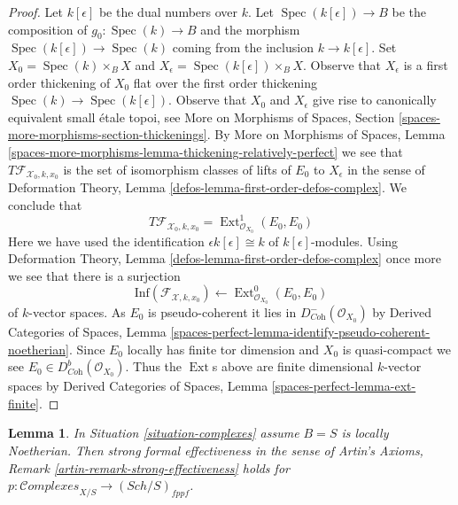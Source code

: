 \documentclass[10pt,a4paper]{amsart}
\theoremstyle{plain}
\newtheorem{lemma}[subsection]{Lemma}
\theoremstyle{definition}
\theoremstyle{remark}
\numberwithin{equation}{subsection}
\def\Spec{\mathop{\mathrm{Spec}}}
\def\Ext{\mathop{\mathrm{Ext}}\nolimits}
\def\Sch{\mathit{Sch}}
\def\Complexesstack{\mathcal{C}\!\mathit{omplexes}}
\begin{document}
\begin{proof}
\medskip\noindent
Let $k[\epsilon]$ be the dual numbers over $k$.
Let $\Spec(k[\epsilon]) \to B$ be the composition of $g_0 : \Spec(k) \to B$
and the morphism $\Spec(k[\epsilon]) \to \Spec(k)$
coming from the inclusion $k \to k[\epsilon]$.
Set $X_0 = \Spec(k) \times_B X$ and
$X_\epsilon = \Spec(k[\epsilon]) \times_B X$.
Observe that $X_\epsilon$ is a first order thickening of $X_0$
flat over the first order thickening $\Spec(k) \to \Spec(k[\epsilon])$.
Observe that $X_0$ and $X_\epsilon$ give rise to canonically equivalent
small \'etale topoi, see
More on Morphisms of Spaces, Section
\ref{spaces-more-morphisms-section-thickenings}.
By More on Morphisms of Spaces, Lemma
\ref{spaces-more-morphisms-lemma-thickening-relatively-perfect}
we see that $T\mathcal{F}_{\mathcal{X}_0, k, x_0}$ is the set of
isomorphism classes of lifts of $E_0$ to $X_\epsilon$ in the sense of
Deformation Theory, Lemma \ref{defos-lemma-first-order-defos-complex}.
We conclude that
$$
T\mathcal{F}_{\mathcal{X}_0, k, x_0} =
\Ext^1_{\mathcal{O}_{X_0}}(E_0, E_0)
$$
Here we have used the identification $\epsilon k[\epsilon] \cong k$
of $k[\epsilon]$-modules. Using
Deformation Theory, Lemma \ref{defos-lemma-first-order-defos-complex}
once more we see that there is a surjection
$$
\text{Inf}(\mathcal{F}_{\mathcal{X}, k, x_0})
\leftarrow
\Ext^0_{\mathcal{O}_{X_0}}(E_0, E_0)
$$
of $k$-vector spaces. As $E_0$ is pseudo-coherent it lies in
$D^-_{\textit{Coh}}(\mathcal{O}_{X_0})$ by
Derived Categories of Spaces, Lemma
\ref{spaces-perfect-lemma-identify-pseudo-coherent-noetherian}.
Since $E_0$ locally has finite tor dimension and $X_0$
is quasi-compact we see $E_0 \in D^b_{\textit{Coh}}(\mathcal{O}_{X_0})$.
Thus the $\Ext$s above are finite dimensional $k$-vector spaces
by Derived Categories of Spaces, Lemma
\ref{spaces-perfect-lemma-ext-finite}.
\end{proof}

\begin{lemma}
\label{lemma-complexes-strong-effectiveness}
In Situation \ref{situation-complexes} assume $B = S$ is locally Noetherian.
Then strong formal effectiveness in the sense of
Artin's Axioms, Remark \ref{artin-remark-strong-effectiveness}
holds for $p : \Complexesstack_{X/S} \to (\Sch/S)_{fppf}$.
\end{lemma}
\end{document}
